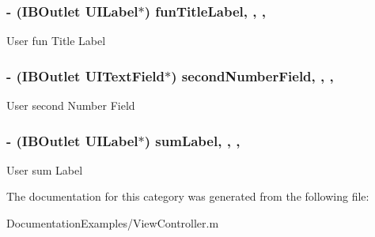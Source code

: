 \subsubsection[{fun\+Title\+Label}]{\setlength{\rightskip}{0pt plus 5cm}-\/ (I\+B\+Outlet U\+I\+Label$\ast$) fun\+Title\+Label\hspace{0.3cm}{\ttfamily [read]}, {\ttfamily [write]}, {\ttfamily [nonatomic]}, {\ttfamily [weak]}}\label{category_view_controller_07_08_a1ef022914e2412340ecaaa0b3d1e9211}
User fun Title Label \hypertarget{category_view_controller_07_08_a08e26ac06941fdcd69176de116478ceb}{}
\subsubsection[{second\+Number\+Field}]{\setlength{\rightskip}{0pt plus 5cm}-\/ (I\+B\+Outlet U\+I\+Text\+Field$\ast$) second\+Number\+Field\hspace{0.3cm}{\ttfamily [read]}, {\ttfamily [write]}, {\ttfamily [nonatomic]}, {\ttfamily [weak]}}\label{category_view_controller_07_08_a08e26ac06941fdcd69176de116478ceb}
User second Number Field \hypertarget{category_view_controller_07_08_a7436e65d71bab732655bcbe6418255b2}{}
\subsubsection[{sum\+Label}]{\setlength{\rightskip}{0pt plus 5cm}-\/ (I\+B\+Outlet U\+I\+Label$\ast$) sum\+Label\hspace{0.3cm}{\ttfamily [read]}, {\ttfamily [write]}, {\ttfamily [nonatomic]}, {\ttfamily [weak]}}\label{category_view_controller_07_08_a7436e65d71bab732655bcbe6418255b2}
User sum Label 

The documentation for this category was generated from the following file\+:\begin{DoxyCompactItemize}
\item 
Documentation\+Examples/View\+Controller.\+m\end{DoxyCompactItemize}
